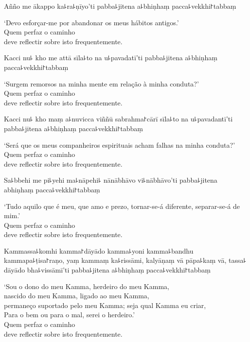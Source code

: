 \documentclass[
  babelLanguage=english,
  final,
  webversion,
]{chantingbook}
\begin{document}
Añño me ākappo ka꜕ra꜕ṇīyo'ti pabba꜕jitena a꜕bhiṇhaṃ pacca꜕vekkhi꜓tabbaṃ

\begin{english}
  `Devo esforçar-me por abandonar os meus hábitos antigos.'\\
  Quem perfaz o caminho\\
  deve reflectir sobre isto frequentemente.
\end{english}

\clearpage

Kacci nu꜕ kho me attā sīla꜕to na u꜕pavadatī'ti pabba꜕jitena a꜕bhiṇhaṃ pacca꜕vekkhi꜓tabbaṃ

\begin{english}
  `Surgem remorsos na minha mente em relação à minha conduta?'\\
  Quem perfaz o caminho\\
  deve reflectir sobre isto frequentemente.
\end{english}

Kacci nu꜕ kho maṃ a꜕nuvicca viññū sabrahma꜓cārī sīla꜕to na u꜕pavadantī'ti pabba꜕jitena a꜕bhiṇhaṃ pacca꜕vekkhi꜓tabbaṃ

\begin{english}
  `Será que os meus companheiros espirituais acham falhas na minha conduta?'\\
  Quem perfaz o caminho\\
  deve reflectir sobre isto frequentemente.
\end{english}

Sa꜕bbehi me pi꜕yehi ma꜕nāpehi꜕ nānābhāvo vi꜕nābhāvo'ti pabba꜕jitena abhiṇhaṃ pacca꜕vekkhi꜓tabbaṃ

\begin{english}
  `Tudo aquilo que é meu, que amo e prezo, tornar-se-á diferente, separar-se-á de mim.'\\
  Quem perfaz o caminho\\
  deve reflectir sobre isto frequentemente.
\end{english}

Kammassa꜕komhi kamma꜓dāyādo kamma꜕yoni kamma꜕bandhu kammapa꜕ṭisa꜓raṇo, yaṃ kammaṃ ka꜕rissāmi, kalyāṇaṃ vā pāpa꜕kaṃ vā, tassa꜕ dāyādo bha꜕vissāmī'ti pabba꜕jitena a꜕bhiṇhaṃ pacca꜕vekkhi꜓tabbaṃ

\enlargethispage{2\baselineskip}

\begin{english}
  `Sou o dono do meu Kamma, herdeiro do meu Kamma,\\
  nascido do meu Kamma, ligado ao meu Kamma,\\
  permaneço suportado pelo meu Kamma; seja qual Kamma eu criar,\\
  Para o bem ou para o mal,  serei o herdeiro.'\\
  Quem perfaz o caminho\\
  deve reflectir sobre isto frequentemente.
\end{english}
\end{document}
